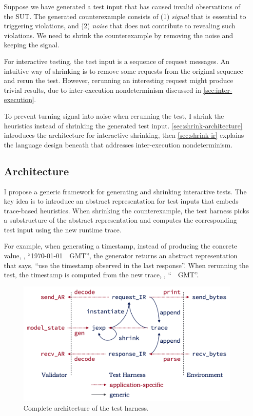 Suppose we have generated a test input that has caused invalid observations of
the SUT.  The generated counterexample consists of (1) {\em signal} that is
essential to triggering violations, and (2) {\em noise} that does not contribute
to revealing such violations.  We need to shrink the counterexample by removing
the noise and keeping the signal.

For interactive testing, the test input is a sequence of request messages.  An
intuitive way of shrinking is to remove some requests from the original sequence
and rerun the test.  However, rerunning an interesting request might produce
trivial results, due to inter-execution nondeterminism discussed in
\autoref{sec:inter-execution}.

To prevent turning signal into noise when rerunning the test, I shrink the
heuristics instead of shrinking the generated test input.
\autoref{sec:shrink-architecture} introduces the architecture for interactive
shrinking, then \autoref{sec:shrink-ir} explains the language design beneath
that addresses inter-execution nondeterminism.

\subsection{Architecture}
\label{sec:shrink-architecture}

I propose a generic framework for generating and shrinking interactive tests.
The key idea is to introduce an abstract representation for test inputs that
embeds trace-based heuristics.  When shrinking the counterexample, the test
harness picks a substructure of the abstract representation and computes the
corresponding test input using the new runtime trace.

For example, when generating a timestamp, instead of producing the concrete
value, \eg, ``\httpdate\today~\currenttime~GMT'', the generator returns an
abstract representation that says, ``use the timestamp observed in the last
response''.  When rerunning the test, the timestamp is computed from the new
trace, \eg, ``\httpdate\DayAfter~\currenttime~GMT''.

\begin{figure}
  \includegraphics[width=.85\textwidth]{figures/shrink}
  \caption{Complete architecture of the test harness.}
  \label{fig:shrink}
\end{figure}

